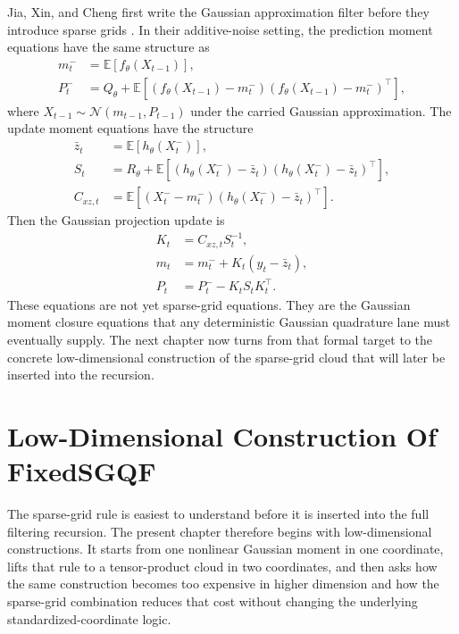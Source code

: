 \documentclass[11pt]{article}
\numberwithin{equation}{section}
\newcommand{\E}{\mathbb E}
\newcommand{\N}{\mathcal N}
\begin{document}
Jia, Xin, and Cheng first write the Gaussian approximation filter before they
introduce sparse grids \cite[Section 2.2]{jia2012sparsegrid}.  In their
additive-noise setting, the prediction moment equations have the same
structure as
\begin{align}
  m_t^-&=\E[f_\theta(X_{t-1})],
  \label{eq:p32-source-pred-mean}\\
  P_t^-&=
  Q_\theta+
  \E[(f_\theta(X_{t-1})-m_t^-)(f_\theta(X_{t-1})-m_t^-)^\top],
  \label{eq:p32-source-pred-cov}
\end{align}
where \(X_{t-1}\sim\N(m_{t-1},P_{t-1})\) under the carried Gaussian
approximation.  The update moment equations have the structure
\begin{align}
  \bar z_t&=\E[h_\theta(X_t^-)],
  \label{eq:p32-source-zbar}\\
  S_t&=
  R_\theta+
  \E[(h_\theta(X_t^-)-\bar z_t)(h_\theta(X_t^-)-\bar z_t)^\top],
  \label{eq:p32-source-S}\\
  C_{xz,t}&=
  \E[(X_t^- -m_t^-)(h_\theta(X_t^-)-\bar z_t)^\top].
  \label{eq:p32-source-Cxz}
\end{align}
Then the Gaussian projection update is
\begin{align}
  K_t&=C_{xz,t}S_t^{-1},
  \label{eq:p32-source-K}\\
  m_t&=m_t^-+K_t(y_t-\bar z_t),
  \label{eq:p32-source-m-update}\\
  P_t&=P_t^- -K_tS_tK_t^\top.
  \label{eq:p32-source-P-update}
\end{align}
These equations are not yet sparse-grid equations.  They are the Gaussian moment
closure equations that any deterministic Gaussian quadrature lane must eventually
supply.  The next chapter now turns from that formal target to the concrete
low-dimensional construction of the sparse-grid cloud that will later be inserted
into the recursion.

\section{Low-Dimensional Construction Of FixedSGQF}
\label{sec:p34-motivating-cases}

The sparse-grid rule is easiest to understand before it is inserted into the full
filtering recursion.  The present chapter therefore begins with low-dimensional
constructions.  It starts from one nonlinear Gaussian moment in one coordinate,
lifts that rule to a tensor-product cloud in two coordinates, and then asks how
the same construction becomes too expensive in higher dimension and how the
sparse-grid combination reduces that cost without changing the underlying
standardized-coordinate logic.
\end{document}

